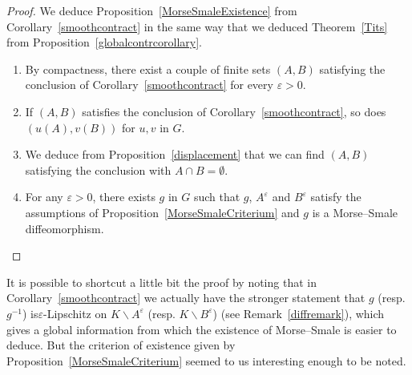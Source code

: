\documentclass[AHL,Unicode,longabstracts,published]{cedram}
\newcommand{\ep}{\varepsilon}
\begin{document}
\begin{proof}
We deduce Proposition~\ref{MorseSmaleExistence} from Corollary~\ref{smoothcontract} in the same way that we deduced Theorem~\ref{Tits} from Proposition~\ref{globalcontrcorollary}.
\begin{enumerate}
\item By compactness, there exist a couple of finite sets $(A,B)$ satisfying the conclusion of Corollary~\ref{smoothcontract} for every $\ep>0$.
\item If $(A,B)$ satisfies the conclusion of Corollary~\ref{smoothcontract}, so does $(u(A),v(B))$ for $u,v$ in $G$.
\item We deduce from Proposition~\ref{displacement} that we can find $(A,B)$ satisfying the conclusion with $A\cap B=\emptyset$.
\item For any $\ep>0$, there exists $g$ in $G$ such that $g$, $A^\ep$ and $B^\ep$ satisfy the assumptions of Proposition~\ref{MorseSmaleCriterium} and $g$ is a Morse--Smale diffeomorphism.\qedhere
\end{enumerate}\let\qed\relax
\end{proof}


\begin{rema}
It is possible to shortcut a little bit the proof by noting that in Corollary~\ref{smoothcontract} we actually have the stronger statement that $g$ (resp. $g^{-1}$) is\linebreak $\ep$-Lipschitz on $K\backslash A^\ep$ (resp. $K\backslash B^\ep$) (see Remark~\ref{diffremark}), which gives a global information from which the existence of Morse--Smale is easier to deduce. But the criterion of existence given by Proposition~\ref{MorseSmaleCriterium} seemed to us interesting enough to be noted.
\end{rema}

\let\OLDthebibliography\thebibliography
\renewcommand\thebibliography[1]{
\OLDthebibliography{#1}
\setlength{\parskip}{0pt}
\setlength{\itemsep}{5pt plus 0.3ex}}


\end{document}
